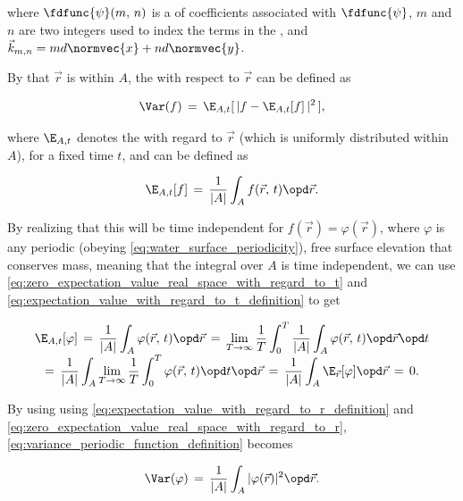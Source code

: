 where $\fdfunc{\psi}(m,\,n)$ is a \twodimensional \sequence of coefficients associated with $\fdfunc{\psi}$, $m$ and $n$ are two integers used to index the terms in the \series, and $\vec{k}_{m,n} = md\normvec{x} + nd\normvec{y}$.

\comment
{
By \assuming that $\vec{r}$ is  within $A$, the  with respect to $\vec{r}$ can be defined as

\begin{equation} \label{eq:variance_periodic_function_definition}
\Var(f) \,=\, \E_{A,t}[\,|f - \E_{A,t}[f]\,|^2\,],
\end{equation}

where $\E_{A,t}$ denotes the  with regard to  $\vec{r}$ (which is uniformly distributed within $A$), for a fixed time $t$, and can be defined as

\begin{equation} \label{eq:expectation_value_with_regard_to_r_definition}
\E_{A,t}[f] \,=\, \frac{1}{|A|}\int_A f(\vec{r},\,t)\opd\vec{r}.
\end{equation}

By realizing that this  will be time independent for $f(\vec{r}) = \varphi(\vec{r})$, where $\varphi$ is any periodic (obeying \eqref{eq:water_surface_periodicity}), free surface elevation that conserves mass, meaning that the integral over $A$ is time independent, we can use \eqref{eq:zero_expectation_value_real_space_with_regard_to_t} and \eqref{eq:expectation_value_with_regard_to_t_definition} to get

\begin{equation} \label{eq:zero_expectation_value_real_space_with_regard_to_r}
\renewcommand*{\arraystretch}{2}
\begin{array}{c}
\displaystyle \E_{A,t}[\varphi] \,=\, \frac{1}{|A|}\int_A \varphi(\vec{r},\,t)\opd\vec{r} \,=\, \lim_{T\to\infty}\frac{1}{T}\int_0^T\frac{1}{|A|}\int_A \varphi(\vec{r},\,t)\opd\vec{r}\opd t \\
\displaystyle =\, \frac{1}{|A|}\int_A\lim_{T\to\infty}\frac{1}{T}\int_0^T \varphi(\vec{r},\,t)\opd t\opd\vec{r} \,=\, \frac{1}{|A|}\int_A \E_{\vec{r}}[\varphi]\opd\vec{r} \,=\, 0.
\end{array}
\end{equation}

By using using \eqref{eq:expectation_value_with_regard_to_r_definition} and \eqref{eq:zero_expectation_value_real_space_with_regard_to_r}, \eqref{eq:variance_periodic_function_definition} becomes

\begin{equation} \label{eq:variance_integral}
\Var(\varphi) \,=\, \frac{1}{|A|}\int_A|\varphi(\vec{r})|^2\opd\vec{r}.
\end{equation}
}


